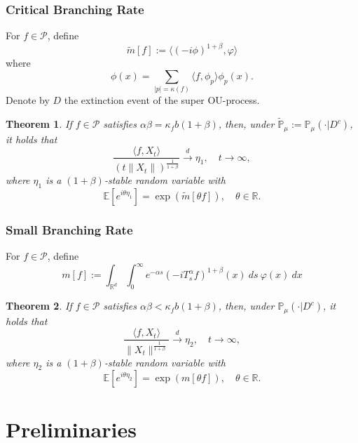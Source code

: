 \documentclass[12pt]{amsart}
\theoremstyle{plain}
\newtheorem{thm}{Theorem}[section]
\theoremstyle{definition}
\numberwithin{equation}{section}
\begin{document}
\subsubsection{Critical Branching Rate}
    For $f\in \mathcal{P}$, define
\[
    \tilde{m}[f]
    := \langle(-i\phi)^{1+\beta},\varphi\rangle
\]
    where
\[
    \phi(x)
    =\sum_{|p|=\kappa(f)}\langle f,\phi_p\rangle\phi_p(x).
\]
    Denote by $D$ the extinction event of the super OU-process.
\begin{thm}
\label{Theorem12}
    If $f\in\mathcal{P}$ satisfies  $\alpha\beta=\kappa_fb(1+\beta)$, then, under $\tilde{\mathbb P}_\mu := \mathbb{P}_{\mu}(\cdot|D^c)$, it holds that
\[
    \frac{\langle f,X_t\rangle}{\left(t\|X_t\|\right)^{\frac{1}{1+\beta}}}
    \xrightarrow{d} \eta_1, 
    \quad t\rightarrow \infty,
\]
    where $\eta_1$ is a $(1+\beta)$-stable random variable with
\[
    \mathbb{E} [e^{i\theta \eta_1}]
    =\exp(\tilde{m}[\theta f]), 
    \quad \theta\in \mathbb R.
\]
\end{thm}

\subsubsection{Small Branching Rate}

For $f\in \mathcal{P}$, define
\[
    m[f]
    :=\int_{\mathbb{R}^d}\int_0^{\infty} e^{-\alpha s}(-iT_{s}^{\alpha}f)^{1+\beta}(x)~ds~\varphi(x)~dx
\]
\begin{thm}
\label{Theorem13}
    If $f\in\mathcal{P}$ satisfies  $\alpha\beta<\kappa_f b(1+\beta)$, then, under $\mathbb{P}_{\mu}(\cdot|D^c)$, it holds that
    $$\frac{\langle f,X_t\rangle}{\|X_t\|^{\frac{1}{1+\beta}}}\xrightarrow{d} \eta_2, \quad t\rightarrow \infty,$$
    where $\eta_2$ is a $(1+\beta)$-stable random variable with 
    $$\mathbb{E} [e^{i\theta \eta_2}]=\exp(m[\theta f]), \quad \theta\in \mathbb R.$$
\end{thm}

\section{Preliminaries}
\end{document}
